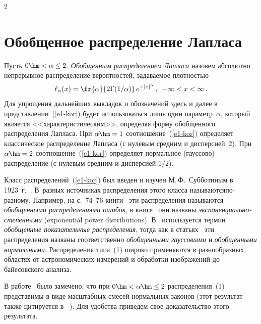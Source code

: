       \begin{multicols}{2}

            \label{st\stat}

\section{Обобщенное распределение Лапласа}

Пусть $0\hm<\alpha\le 2$. {\it Обобщенным распределением Лапласа}
назовем абсолютно непрерывное распределение вероятностей, задаваемое
плот\-ностью
\begin{equation}
\ell_{\alpha}(x)=\fr{\alpha}{2\Gamma({1}/{\alpha})} \,
e^{-|x|^{\alpha}}\,,\enskip -\infty< x<\infty\,.
\label{e1-kor}
\end{equation}
Для упрощения дальнейших выкладок и обозначений здесь и далее в
представлении~(\ref{e1-kor}) будет использоваться лишь один параметр~$\alpha$,
который является <<характеристическим>>, определяя форму обобщенного
распределения Лапласа. При $\alpha\hm=1$ соотношение~(\ref{e1-kor}) определяет
классическое распределение Лапласа (с нулевым средним и дисперсией~2). 
При $\alpha\hm=2$ соотношение~(\ref{e1-kor}) определяет нормальное (гауссово)
распределение (с нулевым средним и дисперсией $1/2$).

Класс распределений~(\ref{e1-kor}) был введен и изучен М.\,Ф.~Субботиным в
1923~г.~\cite{Subbotin1923}. В~разных источ\-никах распределения этого
класса называются\linebreak по-раз\-но\-му. Например, на с.~74--76 книги~\cite{Evans2000} 
эти распределения называются {\it обобщенными
распределениями ошибок}, в книге~\cite{BoxTiao1973} они названы {\it
экс\-по\-нен\-ци\-аль\-но-сте\-пен\-н$\acute{\mbox{ы}}$ми} (exponential power distributions). 
В~\cite{Morgan1996} используется термин {\it обобщенные показатель\-ные
распределения}, тогда как в статьях~\cite{Varanasi1989, Nadaraja2005} 
эти распределения названы соответственно {\it
обобщенными гауссовыми} и {\it обобщенными нормальными}.
Распределения типа~(1) широко применяются в разнообразных областях
от астрономических измерений и обработки изображений до байесовского
анализа.

В работе~\cite{West1987} было замечено, что при $0\hm<\alpha\hm\le2$
распределения~(1) представимы в виде масштабных смесей
нормальных законов (этот результат также цитируется
в ~\cite{ChoySmith1997}). Для удобства приведем свое до\-ка\-зательство этого
результата.


\end{multicols}
